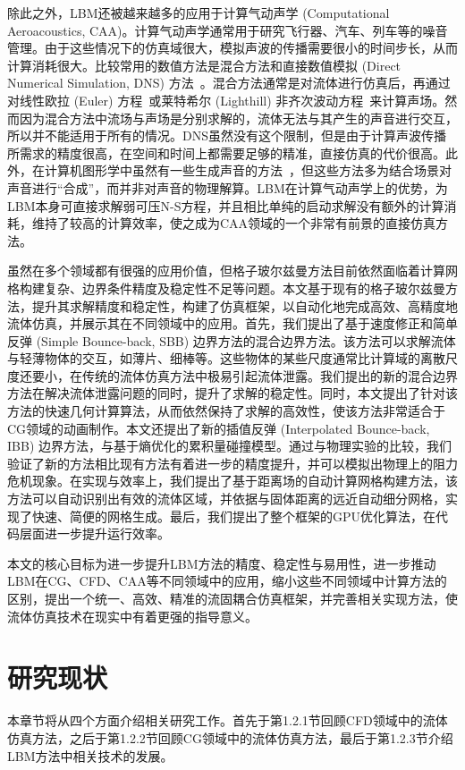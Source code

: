 除此之外，LBM还被越来越多的应用于计算气动声学 (Computational Aeroacoustics, CAA)。计算气动声学通常用于研究飞行器、汽车、列车等的噪音管理。由于这些情况下的仿真域很大，模拟声波的传播需要很小的时间步长，从而计算消耗很大。比较常用的数值方法是混合方法和直接数值模拟 (Direct Numerical Simulation, DNS) 方法~\cite{doi:10.2514/1.15993}。混合方法通常是对流体进行仿真后，再通过对线性欧拉 (Euler) 方程~\cite{doi:10.1080/10618560410001673498,Bogey:2002:1610-1928:463,doi:10.2514/1.18933}或莱特希尔 (Lighthill) 非齐次波动方程~\cite{doi:10.1098/rspa.1952.0060}来计算声场。然而因为混合方法中流场与声场是分别求解的，流体无法与其产生的声音进行交互，所以并不能适用于所有的情况。DNS虽然没有这个限制，但是由于计算声波传播所需求的精度很高，在空间和时间上都需要足够的精准，直接仿真的代价很高。此外，在计算机图形学中虽然有一些生成声音的方法~\cite{10.1145/2897826.2927375}，但这些方法多为结合场景对声音进行“合成”，而并非对声音的物理解算。LBM在计算气动声学上的优势，为LBM本身可直接求解弱可压N-S方程，并且相比单纯的启动求解没有额外的计算消耗，维持了较高的计算效率，使之成为CAA领域的一个非常有前景的直接仿真方法。

虽然在多个领域都有很强的应用价值，但格子玻尔兹曼方法目前依然面临着计算网格构建复杂、边界条件精度及稳定性不足等问题。本文基于现有的格子玻尔兹曼方法，提升其求解精度和稳定性，构建了仿真框架，以自动化地完成高效、高精度地流体仿真，并展示其在不同领域中的应用。首先，我们提出了基于速度修正和简单反弹 (Simple Bounce-back, SBB) 边界方法的混合边界方法。该方法可以求解流体与轻薄物体的交互，如薄片、细棒等。这些物体的某些尺度通常比计算域的离散尺度还要小，在传统的流体仿真方法中极易引起流体泄露。我们提出的新的混合边界方法在解决流体泄露问题的同时，提升了求解的稳定性。同时，本文提出了针对该方法的快速几何计算算法，从而依然保持了求解的高效性，使该方法非常适合于CG领域的动画制作。本文还提出了新的插值反弹 (Interpolated Bounce-back, IBB) 边界方法，与基于熵优化的累积量碰撞模型。通过与物理实验的比较，我们验证了新的方法相比现有方法有着进一步的精度提升，并可以模拟出物理上的阻力危机现象。在实现与效率上，我们提出了基于距离场的自动计算网格构建方法，该方法可以自动识别出有效的流体区域，并依据与固体距离的远近自动细分网格，实现了快速、简便的网格生成。最后，我们提出了整个框架的GPU优化算法，在代码层面进一步提升运行效率。

本文的核心目标为进一步提升LBM方法的精度、稳定性与易用性，进一步推动LBM在CG、CFD、CAA等不同领域中的应用，缩小这些不同领域中计算方法的区别，提出一个统一、高效、精准的流固耦合仿真框架，并完善相关实现方法，使流体仿真技术在现实中有着更强的指导意义。


\section{研究现状}
本章节将从四个方面介绍相关研究工作。首先于第1.2.1节回顾CFD领域中的流体仿真方法，之后于第1.2.2节回顾CG领域中的流体仿真方法，最后于第1.2.3节介绍LBM方法中相关技术的发展。

